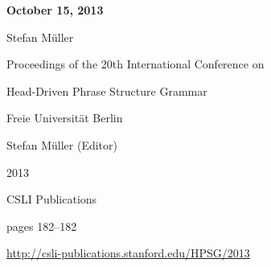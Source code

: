\documentclass[a4paper,11pt]{article}
\begin{document}
\begin{center}
  {\huge\bf October 15, 2013\par}

  \bigskip

  {\LARGE Stefan M\"{u}ller\par}

  \vspace*{3\bigskipamount}

  Proceedings of the 20th International Conference on\par Head-Driven Phrase Structure Grammar

  \bigskip

  Freie Universit\"{a}t Berlin

  \medskip

  Stefan Müller (Editor)

  \medskip

  2013

  \medskip

  CSLI Publications

  \medskip

  pages 182--182

  \medskip

  \url{http://csli-publications.stanford.edu/HPSG/2013}
\end{center}

\newpage

        
\end{document}
